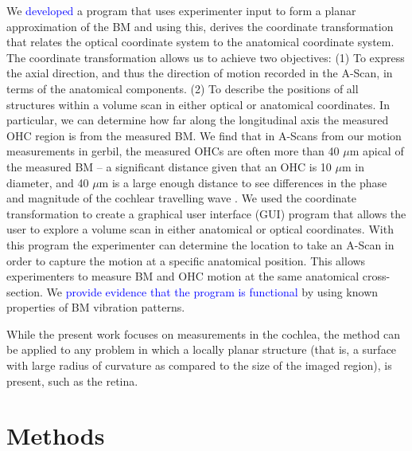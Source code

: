 \documentclass[preprint,NumberedRefs]{JASA}
\begin{document}
\par{We \textcolor{blue}{developed} a program that uses experimenter input to form a planar approximation of the BM and using this, derives the coordinate transformation that relates the optical coordinate system to the anatomical coordinate system. The coordinate transformation allows us to achieve two objectives: (1) To express the axial direction, and thus the direction of motion recorded in the A-Scan, in terms of the anatomical components. (2) To describe the positions of all structures within a volume scan in either optical or anatomical coordinates.  In particular, we can determine how far along the longitudinal axis the measured OHC region is from the measured BM. We find that in A-Scans from our motion measurements in gerbil, the measured OHCs are often more than 40 $\mu$m apical of the measured BM -- a significant distance given that an OHC is 10 $\mu$m in diameter, and 40 $\mu$m is a large enough distance to see differences in the phase and magnitude of the cochlear travelling wave \citep{Ren2002}.  We used the coordinate transformation to create a graphical user interface (GUI) program that allows the user to explore a volume scan in either anatomical or optical coordinates. With this program the experimenter can determine the location to take an A-Scan in order to capture the motion at a specific anatomical position. This allows experimenters to measure BM and OHC motion at the same anatomical cross-section. We \textcolor{blue}{provide evidence that the program is functional} by using known properties of BM vibration patterns.}
\par{While the present work focuses on measurements in the cochlea, the method can be applied to any problem in which a locally planar structure (that is, a surface with large radius of curvature as compared to the size of the imaged region), is present, such as the retina.}
\section{Methods}
\end{document}
